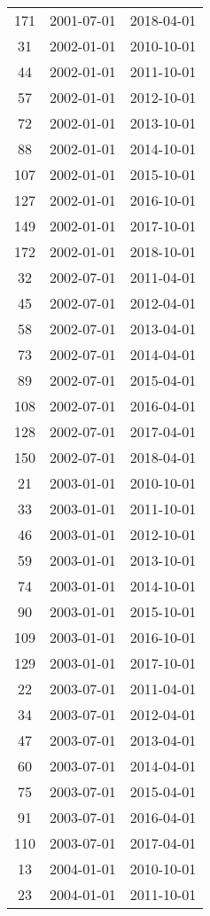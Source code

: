 \begin{tabular}{ccc}
  171 & 2001-07-01 & 2018-04-01 \\ 
  31 & 2002-01-01 & 2010-10-01 \\ 
  44 & 2002-01-01 & 2011-10-01 \\ 
  57 & 2002-01-01 & 2012-10-01 \\ 
  72 & 2002-01-01 & 2013-10-01 \\ 
  88 & 2002-01-01 & 2014-10-01 \\ 
  107 & 2002-01-01 & 2015-10-01 \\ 
  127 & 2002-01-01 & 2016-10-01 \\ 
  149 & 2002-01-01 & 2017-10-01 \\ 
  172 & 2002-01-01 & 2018-10-01 \\ 
  32 & 2002-07-01 & 2011-04-01 \\ 
  45 & 2002-07-01 & 2012-04-01 \\ 
  58 & 2002-07-01 & 2013-04-01 \\ 
  73 & 2002-07-01 & 2014-04-01 \\ 
  89 & 2002-07-01 & 2015-04-01 \\ 
  108 & 2002-07-01 & 2016-04-01 \\ 
  128 & 2002-07-01 & 2017-04-01 \\ 
  150 & 2002-07-01 & 2018-04-01 \\ 
  21 & 2003-01-01 & 2010-10-01 \\ 
  33 & 2003-01-01 & 2011-10-01 \\ 
  46 & 2003-01-01 & 2012-10-01 \\ 
  59 & 2003-01-01 & 2013-10-01 \\ 
  74 & 2003-01-01 & 2014-10-01 \\ 
  90 & 2003-01-01 & 2015-10-01 \\ 
  109 & 2003-01-01 & 2016-10-01 \\ 
  129 & 2003-01-01 & 2017-10-01 \\ 
  22 & 2003-07-01 & 2011-04-01 \\ 
  34 & 2003-07-01 & 2012-04-01 \\ 
  47 & 2003-07-01 & 2013-04-01 \\ 
  60 & 2003-07-01 & 2014-04-01 \\ 
  75 & 2003-07-01 & 2015-04-01 \\ 
  91 & 2003-07-01 & 2016-04-01 \\ 
  110 & 2003-07-01 & 2017-04-01 \\ 
  13 & 2004-01-01 & 2010-10-01 \\ 
  23 & 2004-01-01 & 2011-10-01 \\ 

\end{tabular}
